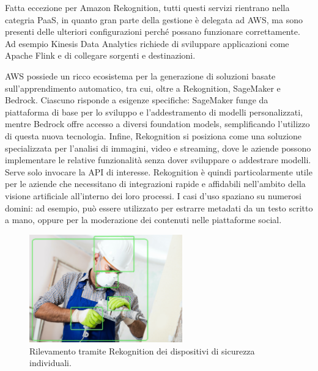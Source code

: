 Fatta eccezione per Amazon Rekognition, tutti questi servizi rientrano nella categria PaaS, in quanto gran parte della gestione è delegata ad AWS, ma sono presenti delle ulteriori configurazioni perché possano funzionare correttamente. Ad esempio Kinesis Data Analytics richiede di sviluppare applicazioni come Apache Flink e di collegare sorgenti e destinazioni. %

AWS possiede un ricco ecosistema per la generazione di soluzioni basate sull'apprendimento automatico, tra cui, oltre a Rekognition, SageMaker e Bedrock. Ciascuno risponde a esigenze specifiche: SageMaker funge da piattaforma di base per lo sviluppo e l'addestramento di modelli personalizzati, mentre Bedrock offre accesso a diversi foundation models, semplificando l'utilizzo di questa nuova tecnologia. Infine, Rekognition si posiziona come una soluzione specializzata per l’analisi di immagini, video e streaming, dove le aziende possono implementare le relative funzionalità senza dover sviluppare o addestrare modelli. Serve solo invocare la API di interesse. Rekognition è quindi particolarmente utile per le aziende che necessitano di integrazioni rapide e affidabili nell'ambito della visione artificiale all'interno dei loro processi. I casi d'uso spaziano su numerosi domini: ad esempio, può essere utilizzato per estrarre metadati da un testo scritto a mano, oppure per la moderazione dei contenuti nelle piattaforme social.

\begin{figure}[htbp]
    \centering
    \includegraphics[width=0.59\textwidth]{figures/worker-with-bb.png}
    \caption{Rilevamento tramite Rekognition dei dispositivi di sicurezza individuali.}
    \label{fig:ppe-example}
\end{figure}


